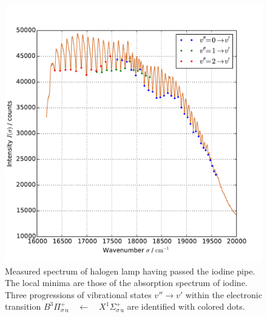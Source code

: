 \begin{figure}
    \centering
    \includegraphics[width=\pltw]{analysis/figures/absorp_03.pdf}
    \caption{Measured spectrum of halogen lamp having passed the iodine pipe. The local minima are 
    those of the absorption spectrum of iodine. Three progressions of vibrational states $v'' \rightarrow v'$
    within the electronic transition 
    $B ^3\Pi_{\sigma \, \mathrm{u}}^{+} \quad \leftarrow \quad X ^1\Sigma_{\sigma \, \mathrm{u}}^{+}$ 
    are identified with colored dots. }
    \label{fig:absorp}
\end{figure}

